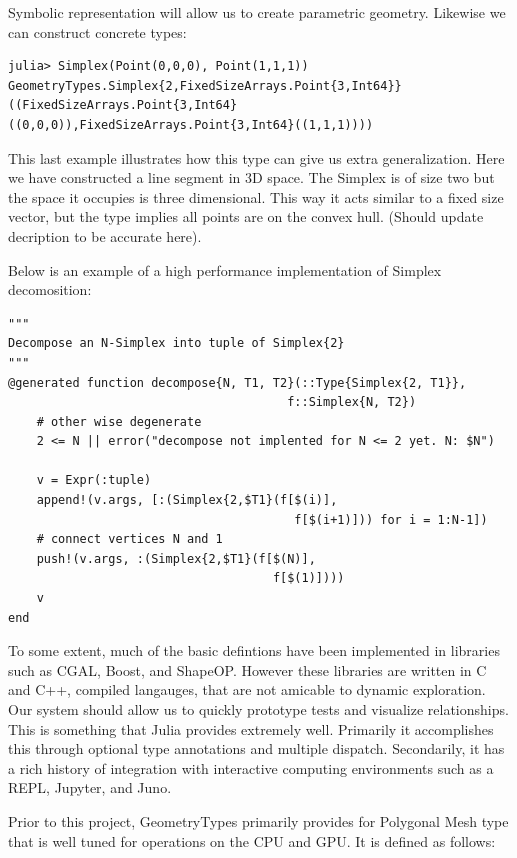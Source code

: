 Symbolic representation will allow us to create parametric geometry.
Likewise we can construct concrete types:

\begin{lstlisting}
julia> Simplex(Point(0,0,0), Point(1,1,1))
GeometryTypes.Simplex{2,FixedSizeArrays.Point{3,Int64}}((FixedSizeArrays.Point{3,Int64}((0,0,0)),FixedSizeArrays.Point{3,Int64}((1,1,1))))
\end{lstlisting}

This last example illustrates how this type can give us extra generalization.
Here we have constructed a line segment in 3D space. The Simplex is of
size two but the space it occupies is three dimensional. This way it acts
similar to a fixed size vector, but the type implies all points are on the
convex hull. (Should update decription to be accurate here).

Below is an example of a high performance implementation of Simplex decomosition:

\begin{lstlisting}
"""
Decompose an N-Simplex into tuple of Simplex{2}
"""
@generated function decompose{N, T1, T2}(::Type{Simplex{2, T1}},
                                       f::Simplex{N, T2})
    # other wise degenerate
    2 <= N || error("decompose not implented for N <= 2 yet. N: $N")

    v = Expr(:tuple)
    append!(v.args, [:(Simplex{2,$T1}(f[$(i)],
                                        f[$(i+1)])) for i = 1:N-1])
    # connect vertices N and 1
    push!(v.args, :(Simplex{2,$T1}(f[$(N)],
                                     f[$(1)])))
    v
end
\end{lstlisting}




To some extent, much of the basic defintions have been implemented
in libraries such as CGAL, Boost, and ShapeOP. However these libraries
are written in C and C++, compiled langauges, that are not amicable to dynamic
exploration. Our system should allow us to quickly prototype tests and
visualize relationships. This is something that Julia provides extremely well.
Primarily it accomplishes this through optional type annotations and
multiple dispatch. Secondarily, it has a rich history of integration with
interactive computing environments such as a REPL, Jupyter, and Juno.


Prior to this project, GeometryTypes primarily provides for Polygonal Mesh
type that is well tuned for operations on the CPU and GPU. It is defined
as follows:

